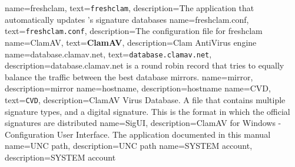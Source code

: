 {
    name={freshclam},
    text={\texttt{freshclam}},
    description={The application that automatically updates \ClamAV's signature databases}
}
{
    name={freshclam.conf},
    text={\texttt{freshclam.conf}},
    description={The configuration file for \gls{freshclam}}
}
{
    name={ClamAV},
    text={\textbf{ClamAV}},
    description={Clam AntiVirus engine}
}
{
    name={database.clamav.net},
    text={\texttt{database.clamav.net}},
    description={database.clamav.net is a round robin record that tries to
	equally balance the traffic between the best database mirrors.}
}
{
    name={mirror},
    description={mirror}
}
{
    name={hostname},
    description={hostname}
}
{
    name={CVD},
    text={\texttt{CVD}},
    description={ClamAV Virus Database. A file that contains multiple signature types, and a digital signature.
	This is the format in which the official signatures are distributed}
}
{
    name={SigUI},
    description={ClamAV for Windows - Configuration User Interface. The
	application documented in this manual}
}
{
    name={UNC path},
    description={UNC path}
}
{
    name={SYSTEM account},
    description={SYSTEM account}
}
